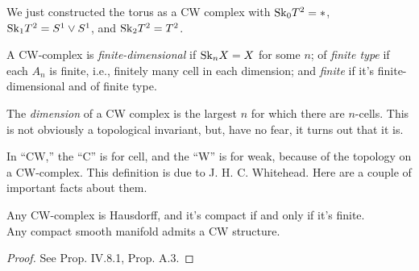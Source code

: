 \begin{example}
We just constructed the torus as a CW complex with $\mathrm{Sk}_0T^2=\ast$, $\mathrm{Sk}_1T^2=S^1\vee S^1$, and $\mathrm{Sk}_2T^2=T^2$.
\end{example}
\begin{definition}
A CW-complex is \emph{finite-dimensional} if $\mathrm{Sk}_nX=X$ for some $n$;
of \emph{finite type} if each $A_n$ is finite, i.e., finitely many cell in each dimension; and \emph{finite} if it's finite-dimensional and of finite type.
\end{definition}
The {\em dimension} of a CW complex is the largest $n$ for which there are 
$n$-cells. This is not obviously a topological invariant, but, have no fear,
it turns out that it is.

In ``CW,'' the ``C'' is for cell, and the ``W'' is for weak, because of the topology on a CW-complex. This definition is due to J. H. C. Whitehead. Here are a couple of important facts about them. 
\begin{theorem}
Any CW-complex is Hausdorff, and it's compact if and only if it's finite. \\
Any compact smooth manifold admits a CW structure.
\end{theorem}
\begin{proof} See \cite{bredon} Prop. IV.8.1, \cite{hatcher} Prop. A.3.
\end{proof}

